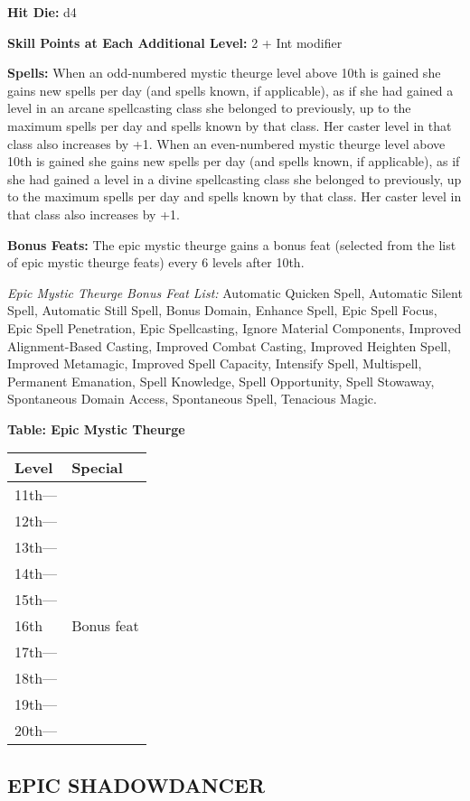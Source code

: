 \documentclass{article}
\begin{document}
\textbf{Hit Die: }d4

\textbf{Skill Points at Each Additional Level: }2 + Int modifier

\textbf{Spells: }When an odd-numbered mystic theurge level above 10th is gained 
she gains new spells per day (and spells known, if applicable), as if she had gained 
a level in an arcane spellcasting class she belonged to previously, up to the maximum 
spells per day and spells known by that class. Her caster level in that class also 
increases by +1. When an even-numbered mystic theurge level above 10th is gained 
she gains new spells per day (and spells known, if applicable), as if she had gained 
a level in a divine spellcasting class she belonged to previously, up to the maximum 
spells per day and spells known by that class. Her caster level in that class also 
increases by +1.

\textbf{Bonus Feats: }The epic mystic theurge gains a bonus feat (selected from 
the list of epic mystic theurge feats) every 6 levels after 10th.

\textit{Epic Mystic Theurge Bonus Feat List: }Automatic Quicken Spell, Automatic 
Silent Spell, Automatic Still Spell, Bonus Domain, Enhance Spell, Epic Spell Focus, 
Epic Spell Penetration, Epic Spellcasting, Ignore Material Components, Improved 
Alignment-Based Casting, Improved Combat Casting, Improved Heighten Spell, Improved 
Metamagic, Improved Spell Capacity, Intensify Spell, Multispell, Permanent Emanation, 
Spell Knowledge, Spell Opportunity, Spell Stowaway, Spontaneous Domain Access, 
Spontaneous Spell, Tenacious Magic.

\textbf{Table: Epic Mystic Theurge}

\begin{tabular}{|>{\raggedright}p{27pt}|>{\raggedright}p{46pt}|}
\hline
L\textbf{evel} & S\textbf{pecial}\tabularnewline
\hline
11th--- & \tabularnewline
\hline
12th--- & \tabularnewline
\hline
13th--- & \tabularnewline
\hline
14th--- & \tabularnewline
\hline
15th--- & \tabularnewline
\hline
16th  & Bonus feat\tabularnewline
\hline
17th--- & \tabularnewline
\hline
18th--- & \tabularnewline
\hline
19th--- & \tabularnewline
\hline
20th--- & \tabularnewline
\hline
\end{tabular}

\vspace{12pt}
\subsection*{{\LARGE{}EPIC SHADOWDANCER }}
\end{document}
